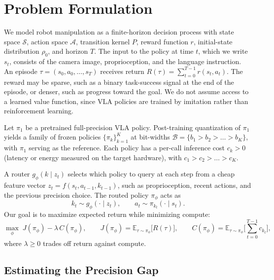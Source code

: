 \documentclass[11pt]{article}
\newcommand{\E}{\mathbb{E}}
\newcommand{\B}{\mathcal{B}}
\begin{document}
\section{Problem Formulation}


We model robot manipulation as a finite-horizon decision process with
state space $\mathcal{S}$, action space $\mathcal{A}$, transition
kernel $P$, reward function $r$, initial-state distribution $\rho_0$,
and horizon $T$.
The input to the policy at time $t$, which we write $s_t$, consists of
the camera image, proprioception, and the language instruction.
An episode $\tau = (s_0, a_0, \dots, s_T)$ receives return
$R(\tau) = \sum_{t=0}^{T-1} r(s_t, a_t)$. The reward may be sparse,
such as a binary task-success signal at the end of the episode, or
denser, such as progress toward the goal. We do not assume access to a
learned value function, since VLA policies are trained by imitation
rather than reinforcement learning.

Let $\pi_1$ be a pretrained full-precision VLA policy. Post-training
quantization of $\pi_1$ yields a family of frozen policies
$\{\pi_k\}_{k=1}^{K}$ at bit-widths
$\B = \{b_1 > b_2 > \dots > b_K\}$, with $\pi_1$ serving as the
reference. Each policy has a per-call inference cost $c_k > 0$
(latency or energy measured on the target hardware), with
$c_1 > c_2 > \dots > c_K$.

A router $g_\phi(k \mid z_t)$ selects which policy to query at each
step from a cheap feature vector $z_t = f(s_t, a_{t-1}, k_{t-1})$,
such as proprioception, recent actions, and the previous precision
choice. The routed policy $\pi_\phi$ acts as
\begin{equation}
  k_t \sim g_\phi(\cdot \mid z_t), \qquad a_t \sim \pi_{k_t}(\cdot \mid s_t).
\end{equation}
Our goal is to maximize expected return while minimizing compute:
\begin{equation}
  \max_\phi \; J(\pi_\phi) - \lambda\, C(\pi_\phi),
  \qquad
  J(\pi_\phi) = \E_{\tau \sim \pi_\phi}\big[R(\tau)\big],
  \qquad
  C(\pi_\phi) = \E_{\tau \sim \pi_\phi}\Big[\sum_{t=0}^{T-1} c_{k_t}\Big],
  \label{eq:objective}
\end{equation}
where $\lambda \ge 0$ trades off return against compute.

\subsection{Estimating the Precision Gap}
\end{document}
